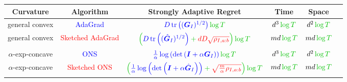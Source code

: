\documentclass[12pt]{article}
\theoremstyle{definition}
\def \G {\bm{G}}
\def \I {\bm{I}}
\newcommand \sbr[1] {\left( #1 \right)}
\newcommand \tr[1] {\operatorname{tr}\sbr{#1}}
\begin{document}
\pagestyle{empty}

\everymath{\textstyle}

\begin{table*}[!ht]
    \centering
    \begin{tabular}{c|c|c|c|c|c}
    \hline
        \textbf{Curvature} & \textbf{Algorithm} & \textbf{Strongly Adaptive Regret} & \textbf{Time} & \textbf{Space} \\ \hline
        general convex & \textcolor{blue}{AdaGrad} & $\mathcolor{gren}{ \mathcolor{blue}{D \tr{(\G_I)^{1/2}}} \log T }$ & $d^3 \mathcolor{gren}{\log T}$ & $d^2 \mathcolor{gren}{\log T}$ \\ \hline
        general convex & \textcolor{red}{Sketched AdaGrad} & $\mathcolor{gren}{ \sbr{ \mathcolor{blue}{D \tr{(\hat{\G}_I)^{1/2}}} + \mathcolor{red}{dD \sqrt{\rho_{I,a:b}}} } \log T }$ & $md \mathcolor{gren}{\log T}$ & $md \mathcolor{gren}{\log T}$ \\ \hline
        $\alpha$-exp-concave & \textcolor{blue}{ONS} & $\mathcolor{gren}{ \mathcolor{blue}{\frac{1}{\alpha} \log\sbr{\det\sbr{\I + \alpha \G_I}}} \log T }$ & $d^3 \mathcolor{gren}{\log T}$ & $d^2 \mathcolor{gren}{\log T}$ \\ \hline
        $\alpha$-exp-concave & \textcolor{red}{Sketched ONS} & $\mathcolor{gren}{ \sbr{ \mathcolor{blue}{\frac{1}{\alpha} \log\sbr{\det\sbr{\I + \alpha \hat{\G}_I}}} + \mathcolor{red}{\sqrt{\frac{m}{\alpha} \rho_{I,a:b}}} } \log T }$ & $md \mathcolor{gren}{\log T}$ & $md \mathcolor{gren}{\log T}$ \\ \hline
    \end{tabular}
\end{table*}
\end{document}
